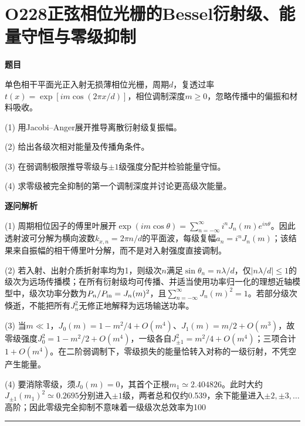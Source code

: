 \documentclass[UTF8,a4paper,11pt,oneside,openany]{ctexbook}
\begin{document}
\section*{O228\quad 正弦相位光栅的Bessel衍射级、能量守恒与零级抑制}
\textbf{题目}\par
单色相干平面光正入射无损薄相位光栅，周期$d$，复透过率$t(x)=\exp[i m\cos(2\pi x/d)]$，相位调制深度$m\ge0$，忽略传播中的偏振和材料吸收。
\par\smallskip\noindent (1) 用Jacobi–Anger展开推导离散衍射级复振幅。
\par\smallskip\noindent (2) 给出各级次相对能量及传播角条件。
\par\smallskip\noindent (3) 在弱调制极限推导零级与$\pm1$级强度分配并检验能量守恒。
\par\smallskip\noindent (4) 求零级被完全抑制的第一个调制深度并讨论更高级次能量。
\par\medskip\textbf{逐问解析}\par
\par\smallskip\noindent (1) 周期相位因子的傅里叶展开$\exp(im\cos\theta)=\sum_{n=-\infty}^\infty i^nJ_n(m)e^{in\theta}$。因此透射波可分解为横向波数$k_{x,n}=2\pi n/d$的平面波，每级复幅$a_n=i^nJ_n(m)$；该结果来自振幅的相干傅里叶分解，而不是对入射强度直接调制。
\par\smallskip\noindent (2) 若入射、出射介质折射率均为1，则级次$n$满足$\sin\theta_n=n\lambda/d$，仅$|n\lambda/d|\le1$的级次为远场传播模；在所有衍射级均可传播、并适当使用功率归一化的理想近轴模型中，级次功率分数为$P_n/P_{\rm in}=J_n(m)^2$，且$\sum_{n=-\infty}^\infty J_n(m)^2=1$。若部分级次倏逝，不能把所有$J_n^2$无修正地解释为远场输送功率。
\par\smallskip\noindent (3) 当$m\ll1$，$J_0(m)=1-m^2/4+O(m^4)$、$J_1(m)=m/2+O(m^3)$，故零级强度$J_0^2=1-m^2/2+O(m^4)$，一级各自$J_{\pm1}^2=m^2/4+O(m^4)$；三项合计$1+O(m^4)$。在二阶弱调制下，零级损失的能量恰转入对称的一级衍射，不凭空产生能量。
\par\smallskip\noindent (4) 要消除零级，须$J_0(m)=0$，其首个正根$m_1\simeq2.404826$。此时大约$J_{\pm1}(m_1)^2\simeq0.2695$分别进入$\pm1$级，两者总和仅约0.539，余下能量进入$\pm2,\pm3,\ldots$高阶；因此零级完全抑制不意味着一级级次总效率为100%
\par\medskip\hrule\medskip
\end{document}
